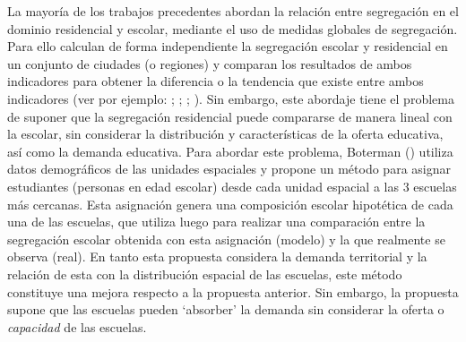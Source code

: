 \documentclass[
  spanish,
  a4paper,%
  chapterprefix=true,%
  DIV=calc,%
  twoside]{scrbook}%
\begin{document}
La mayoría de los trabajos precedentes abordan la relación entre
segregación en el dominio residencial y escolar, mediante el uso de
medidas globales de segregación. Para ello calculan de forma
independiente la segregación escolar y residencial en un conjunto de
ciudades (o regiones) y comparan los resultados de ambos indicadores
para obtener la diferencia o la tendencia que existe entre ambos
indicadores (ver por ejemplo: ; ; ; ). Sin embargo, este abordaje tiene el
problema de suponer que la segregación residencial puede compararse de
manera lineal con la escolar, sin considerar la distribución y
características de la oferta educativa, así como la demanda educativa.
Para abordar este problema, Boterman () utiliza datos demográficos de
las unidades espaciales y propone un método para asignar estudiantes
(personas en edad escolar) desde cada unidad espacial a las 3 escuelas
más cercanas. Esta asignación genera una composición escolar hipotética
de cada una de las escuelas, que utiliza luego para realizar una
comparación entre la segregación escolar obtenida con esta asignación
(modelo) y la que realmente se observa (real). En tanto esta propuesta
considera la demanda territorial y la relación de esta con la
distribución espacial de las escuelas, este método constituye una mejora
respecto a la propuesta anterior. Sin embargo, la propuesta supone que
las escuelas pueden `absorber' la demanda sin considerar la oferta o
\emph{capacidad} de las escuelas.
\end{document}
